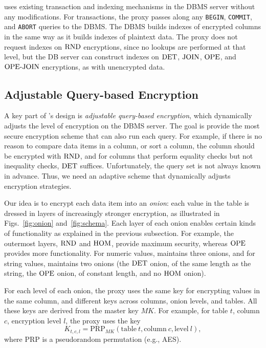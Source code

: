 \name{} uses existing transaction and indexing mechanisms in the DBMS
server without any modifications.  For transactions, the proxy passes
along any {\tt BEGIN}, {\tt COMMIT}, and {\tt ABORT} queries to the
DBMS\@.
The DBMS builds indexes of encrypted columns in the same way as it
builds indexes of plaintext data.  The proxy does not request indexes
on $\textrm{RND}$ encryptions, since no lookups are performed at that level,
but the DB server can construct indexes on $\textrm{DET}$, $\textrm{JOIN}$, $\textrm{OPE}$, and
$\textrm{OPE-JOIN}$ encryptions, as with unencrypted data.

\subsection{Adjustable Query-based Encryption}
\label{ss:onion}

A key part of \name{}'s design is \textit{adjustable query-based
  encryption}, which dynamically adjusts the level of encryption on
the DBMS server.  The goal is provide the most secure encryption
scheme that can also run each query.  For example, if there
is no reason to compare data items in a column, or sort a column, the
column should be encrypted with $\textrm{RND}$, and for columns that perform
equality checks but not inequality checks, $\textrm{DET}$ suffices.
Unfortunately, the query set is not always known in advance.
Thus, we need an adaptive scheme that dynamically
adjusts encryption strategies.

Our idea is to encrypt each data item into an \textit{onion}:
each value in the table is dressed in layers of increasingly stronger
encryption, as illustrated in Figs.~\ref{fig:onion} and~\ref{fig:schema}. Each layer of
each onion enables certain kinds of functionality as explained in the
previous subsection.  For example, the outermost layers, $\textrm{RND}$ and
$\textrm{HOM}$, provide maximum security, whereas $\textrm{OPE}$ provides more
functionality.  For numeric values, \name{} maintains three onions,
and for string values, \name{} maintains two onions (the $\textrm{DET}$ onion,
of the same length as the string, the $\textrm{OPE}$ onion, of constant length,
and no $\textrm{HOM}$ onion).


For each level of each onion, the proxy uses the same key for
encrypting values in the same column, and different keys across
columns, onion levels, and tables.  All these keys are derived from
the master key $\mathit{MK}$\@.  For example, for table $t$, column $c$,
encryption level $l$, the proxy uses the key
\begin{equation}\label{eq:columnkey}
K_{t, c, l} = \textrm{PRP}_\mathit{MK} (\mathrm{table}\>t, \mathrm{column}\>c,
    \mathrm{level}\>l),
\end{equation}
where PRP is a pseudorandom permutation (e.g., AES).

